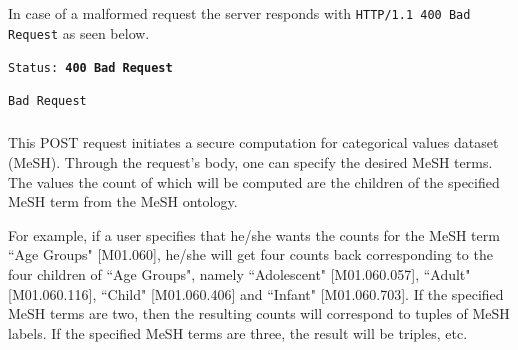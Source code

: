 \begin{description}[labelwidth=5em, leftmargin=\dimexpr\labelwidth+\labelsep\relax]
In case of a malformed request the server responds with \texttt{HTTP/1.1 400 Bad Request} as seen below.\\

\begin{minipage}{\linewidth}
{
\texttt{Status: {\color{BrickRed}\textbf{400 Bad Request}}}
\begin{verbatim}
Bad Request
\end{verbatim}
\label{sc:histogram-numerical-response-2}
}
\end{minipage}

 \end{description}



\subsubsection[/smpc/histogram/categorical POST request]{\protect{}}\label{sss:post2}
This POST request initiates a secure computation for categorical values dataset (MeSH).
Through the request's body, one can specify the desired MeSH terms.
The values the count of which will be computed are the children of the specified MeSH term from the MeSH ontology.

For example, if a user specifies that he/she wants the counts for the MeSH term ``Age Groups" [M01.060], he/she will get four counts back corresponding to the four children of ``Age Groups", namely ``Adolescent" [M01.060.057], ``Adult" [M01.060.116], ``Child" [M01.060.406] and ``Infant" [M01.060.703].
If the specified MeSH terms are two, then the resulting counts will correspond to tuples of MeSH labels.
If the specified MeSH terms are three, the result will be triples, etc.

